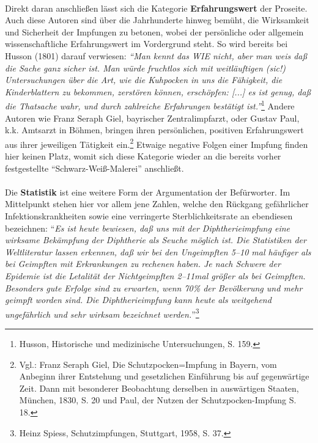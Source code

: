 \documentclass[
    a4paper,
    12pt,
    hyphens,
    chapterprefix=true,
    headheight=33pt,
    footheight=29pt,
    headings=optiontohead, %
]{scrartcl}
\begin{document}
{\\
Direkt daran anschließen lässt sich die Kategorie \textbf{Erfahrungswert} der Proseite. Auch diese Autoren sind über die Jahrhunderte hinweg bemüht, die Wirksamkeit und Sicherheit der Impfungen zu betonen, wobei der persönliche oder allgemein wissenschaftliche Erfahrungswert im Vordergrund steht.
So wird bereits bei Husson (1801) darauf verwiesen: \textit{"`Man kennt das WIE nicht, aber man weis daß die Sache ganz sicher ist. Man würde fruchtlos sich mit weitläuftigen (sic!) Untersuchungen über die Art, wie die Kuhpocken in uns die Fähigkeit, die Kinderblattern zu bekommen, zerstören können, erschöpfen: [...] es ist genug, daß die Thatsache wahr, und durch zahlreiche Erfahrungen bestätigt ist."'}\footnote{Husson, Historische und medizinische Untersuchungen,  S. 159.} Andere Autoren wie Franz Seraph Giel, bayrischer Zentralimpfarzt, oder Gustav Paul, k.k. Amtsarzt in Böhmen, bringen ihren persönlichen, positiven Erfahrungswert aus ihrer jeweiligen Tätigkeit ein.\footnote{Vgl.: Franz Seraph Giel, Die Schutzpocken=Impfung in Bayern, vom Anbeginn ihrer Entstehung und gesetzlichen Einführung  bis auf gegenwärtige Zeit. Dann mit besonderer Beobachtung derselben in auswärtigen Staaten, München, 1830, S. 20 und Paul, der Nutzen der Schutzpocken-Impfung S. 18.} Etwaige negative Folgen einer Impfung finden hier keinen Platz, womit sich diese Kategorie wieder an die bereits vorher festgestellte "`Schwarz-Weiß-Malerei"' anschließt.\\
\\
Die \textbf{Statistik} ist eine weitere Form der Argumentation der Befürworter. Im Mittelpunkt stehen hier vor allem jene Zahlen, welche den Rückgang gefährlicher Infektionskrankheiten sowie eine verringerte Sterblichkeitsrate an ebendiesen bezeichnen: "`\textit{Es ist heute bewiesen, daß uns mit der Diphtherieimpfung eine wirksame Bekämpfung der Diphtherie als Seuche möglich ist. Die Statistiken der Weltliteratur lassen erkennen, daß wir bei den Ungeimpften 5--10 mal häufiger als bei Geimpften mit Erkrankungen zu rechenen haben. Je nach Schwere der Epidemie ist die Letalität der Nichtgeimpften 2--11mal größer als bei Geimpften. Besonders gute Erfolge sind zu erwarten, wenn 70\% der Bevölkerung und mehr geimpft worden sind. Die Diphtherieimpfung kann heute als weitgehend ungefährlich und sehr wirksam bezeichnet werden.}"'\footnote{Heinz Spiess, Schutzimpfungen, Stuttgart, 1958, S. 37.}\\
}
\end{document}
